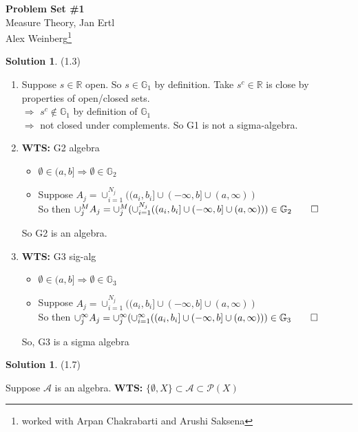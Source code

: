 \documentclass[letterpaper,12pt]{article}
\theoremstyle{definition}
\newtheorem{solution}[theorem]{Solution}
\begin{document}
\begin{flushleft}
  \textbf{\large{Problem Set \#1}} \\
  Measure Theory, Jan Ertl \\
  Alex Weinberg\footnote{worked with Arpan Chakrabarti and Arushi Saksena}
\end{flushleft}

\vspace{5mm}

\begin{solution}(1.3)
  \begin{enumerate}
  \item
  Suppose $s \in \mathbb{R} $ open. So $s \in \mathbb{G}_1$ by definition. Take $s^c \in \mathbb{R}$ is close by properties of open/closed sets. \\
  $\Rightarrow$ $s^c \not \in \mathbb{G}_1$ by definition of $\mathbb{G}_1$ \\
  $\Rightarrow$ not closed under complements. So G1 is not a sigma-algebra.

  \item \textbf{WTS:} G2 algebra
  \begin{itemize}
  \item $\emptyset \in (a,b] \Rightarrow \emptyset \in \mathbb{G}_2 $
  \item Suppose $A_j = \cup_{i=1}^{N_j} ((a_i,b_i] \cup (-\infty,b] \cup (a,\infty))$ \\
  So then $\cup_j^M A_j = \cup_j^M (\cup_{i=1}^{N_j} ((a_i,b_i] \cup (-\infty,b] \cup (a,\infty))) \in \mathbb{G}_2 \qed$
  \end{itemize}
  So G2 is an algebra.

  \item \textbf{WTS:} G3 sig-alg
  \begin{itemize}
    \item $\emptyset \in (a,b] \Rightarrow \emptyset \in \mathbb{G}_3 $
    \item Suppose $A_j = \cup_{i=1}^{N_j} ((a_i,b_i] \cup (-\infty,b] \cup (a,\infty))$ \\
    So then $\cup_j^\infty A_j = \cup_j^\infty (\cup_{i=1}^{\infty} ((a_i,b_i] \cup (-\infty,b] \cup (a,\infty))) \in \mathbb{G}_3 \qed$
  \end{itemize}
  So, G3 is a sigma algebra
  \end{enumerate}
\end{solution}

\begin{solution} (1.7)

Suppose $\mathcal{A}$ is an algebra. \textbf{WTS:} $\{\emptyset,X\} \subset \mathcal{A} \subset \mathcal{P}(X)$
\end{solution}
\end{document}
